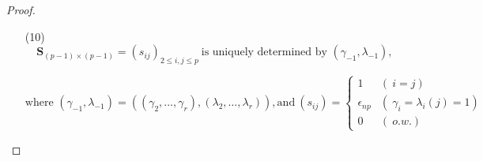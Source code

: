 \begin{proof}
\begin{itemize}
\begin{itemize}
\begin{itemize}
\vspace{5mm}

\item[(10)]
$$\textbf{S}_{(p-1)\times(p-1)}=({s}_{ij})_{2\leq{i,j}\leq{p}}~\text{is~uniquely~determined~by~}(\gamma_{-1},\lambda_{-1}),$$

 $$\text{where~}(\gamma_{-1},\lambda_{-1})=((\gamma_2,\ldots,\gamma_r),(\lambda_2,\ldots,\lambda_r)),\text{and}~({s}_{ij})=\begin{cases} 1 & (~i=j) \\ \epsilon_{np} & (~\gamma_{i}={\lambda_i}(j)=1) \\ 0 & (~o.w.) \end{cases}$$
 
\vspace{5mm}

\end{itemize}
    
\newpage


\end{itemize}
\end{itemize}
\end{proof}
